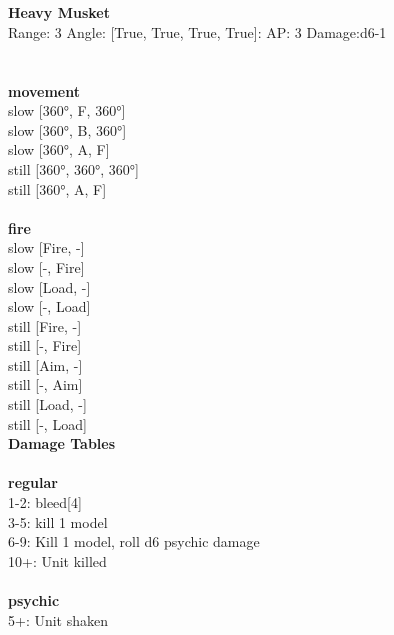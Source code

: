 \ \\

\ \\
{\bf Heavy Musket } \\



Range: 3  Angle: [True, True, True, True]: AP: 3 Damage:d6-1 \\




 
\ \\



\ \\ {\bf movement } \\
slow [360°, F, 360°] \\
slow [360°, B, 360°] \\
slow [360°, A, F] \\
still [360°, 360°, 360°] \\
still [360°, A, F] \\
\ \\ {\bf fire } \\
slow [Fire, -] \\
slow [-, Fire] \\
slow [Load, -] \\
slow [-, Load] \\
still [Fire, -] \\
still [-, Fire] \\
still [Aim, -] \\
still [-, Aim] \\
still [Load, -] \\
still [-, Load] \\


{\bf Damage Tables} \\
\ \\ {\bf regular } \\
1-2: bleed[4] \\
3-5: kill 1 model \\
6-9: Kill 1 model, roll d6 psychic damage \\
10+: Unit killed \\
\ \\ {\bf psychic } \\
5+: Unit shaken \\










\pagebreak\pagebreak

